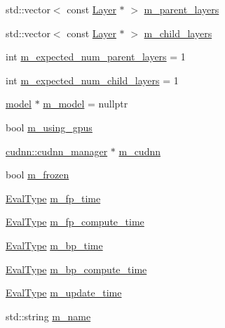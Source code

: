 \begin{DoxyCompactItemize}
std\+::vector$<$ const \hyperlink{classlbann_1_1Layer}{Layer} $\ast$ $>$ \hyperlink{classlbann_1_1Layer_a3fa7c6cf1a22bb14ab0e85e3dc6027c5}{m\+\_\+parent\+\_\+layers}
\item 
std\+::vector$<$ const \hyperlink{classlbann_1_1Layer}{Layer} $\ast$ $>$ \hyperlink{classlbann_1_1Layer_ae348c0d2b4d05f74d809d09debb633c0}{m\+\_\+child\+\_\+layers}
\item 
int \hyperlink{classlbann_1_1Layer_a841b96b25555247f52921c7f13ae1dfa}{m\+\_\+expected\+\_\+num\+\_\+parent\+\_\+layers} = 1
\item 
int \hyperlink{classlbann_1_1Layer_ac08f133dddd150319650e220ab9a523a}{m\+\_\+expected\+\_\+num\+\_\+child\+\_\+layers} = 1
\item 
\hyperlink{classlbann_1_1model}{model} $\ast$ \hyperlink{classlbann_1_1Layer_a3d9315e99574166f2f33e37b572021d2}{m\+\_\+model} = nullptr
\item 
bool \hyperlink{classlbann_1_1Layer_af7881cb5eff5207c15fa835d65462e8f}{m\+\_\+using\+\_\+gpus}
\item 
\hyperlink{classlbann_1_1cudnn_1_1cudnn__manager}{cudnn\+::cudnn\+\_\+manager} $\ast$ \hyperlink{classlbann_1_1Layer_a08dbb94239e3b8c96329786c57c72e21}{m\+\_\+cudnn}
\item 
bool \hyperlink{classlbann_1_1Layer_afdc60df9731a3ecdeeeb8175fa483676}{m\+\_\+frozen}
\item 
\hyperlink{base_8hpp_a3266f5ac18504bbadea983c109566867}{Eval\+Type} \hyperlink{classlbann_1_1Layer_ab1bd9ab0a6f9e554f4dc936d8316028e}{m\+\_\+fp\+\_\+time}
\item 
\hyperlink{base_8hpp_a3266f5ac18504bbadea983c109566867}{Eval\+Type} \hyperlink{classlbann_1_1Layer_aa4e439c1d6a656e709dc4736c9380476}{m\+\_\+fp\+\_\+compute\+\_\+time}
\item 
\hyperlink{base_8hpp_a3266f5ac18504bbadea983c109566867}{Eval\+Type} \hyperlink{classlbann_1_1Layer_aa60fc41627bcaa9c345775bf5737bb45}{m\+\_\+bp\+\_\+time}
\item 
\hyperlink{base_8hpp_a3266f5ac18504bbadea983c109566867}{Eval\+Type} \hyperlink{classlbann_1_1Layer_ae28626457a58943b25e7a2920fc271f0}{m\+\_\+bp\+\_\+compute\+\_\+time}
\item 
\hyperlink{base_8hpp_a3266f5ac18504bbadea983c109566867}{Eval\+Type} \hyperlink{classlbann_1_1Layer_ab7d84533662b02d01ba6685ad6f20935}{m\+\_\+update\+\_\+time}
\item 
std\+::string \hyperlink{classlbann_1_1Layer_aa47109ad09b399142fa92f9d3702189f}{m\+\_\+name}
\end{DoxyCompactItemize}
